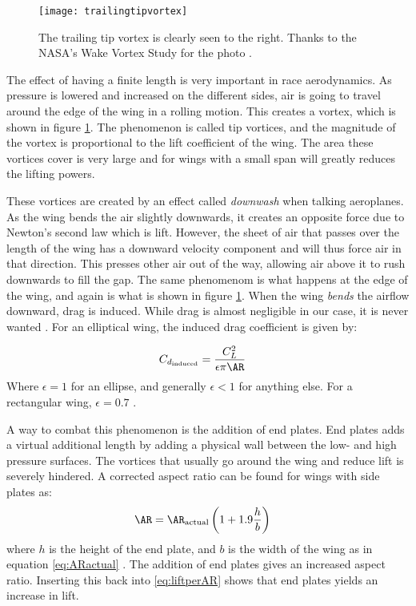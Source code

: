     \begin{figure}
      \texttt{[image: trailingtipvortex]}
      \caption{The trailing tip vortex is clearly seen to the right. Thanks to the NASA's Wake Vortex Study for the photo \cite{nasatipvortex}.}
      \label{fig:trailingtipvortices}
    \end{figure}

    The effect of having a finite length is very important in race aerodynamics. As pressure is lowered and increased on the different sides, air is going to travel around the edge of the wing in a rolling motion. This creates a vortex, which is shown in figure \ref{fig:trailingtipvortices}. The phenomenon is called tip vortices, and the magnitude of the vortex is proportional to the lift coefficient of the wing. The area these vortices cover is very large and for wings with a small span will greatly reduces the lifting powers.

    These vortices are created by an effect called \emph{downwash} when talking aeroplanes. As the wing bends the air slightly downwards, it creates an opposite force due to Newton's second law which is lift. However, the sheet of air that passes over the length of the wing has a downward velocity component and will thus force air in that direction. This presses other air out of the way, allowing air above it to rush downwards to fill the gap. The same phenomenom is what happens at the edge of the wing, and again is what is shown in figure \ref{fig:trailingtipvortices}. When the wing \emph{bends} the airflow downward, drag is induced. While drag is almost negligible in our case, it is never wanted \cite{peterkampf}. For an elliptical wing, the induced drag coefficient is given by:

    \begin{align}
      C_{d_\text{induced}} &= \frac{C_L^2}{\epsilon \pi \AR }
    \end{align}
    Where $\epsilon = 1$ for an ellipse, and generally $\epsilon < 1$ for anything else. For a rectangular wing, $\epsilon = 0.7$ \cite{nasainduceddrag}.

    A way to combat this phenomenon is the addition of end plates. End plates adds a virtual additional length by adding a physical wall between the low- and high pressure surfaces. The vortices that usually go around the wing and reduce lift is severely hindered. A corrected aspect ratio can be found for wings with side plates as:
    \begin{align}
      \AR &= \AR_\text{actual}\left(1+1.9\frac{h}{b}\right) \label{eq:endplates}
    \end{align}
    where $h$ is the height of the end plate, and $b$ is the width of the wing as in equation \ref{eq:ARactual} \cite{jkatz}. The addition of end plates gives an increased aspect ratio. Inserting this back into \ref{eq:liftperAR} shows that end plates yields an increase in lift.

